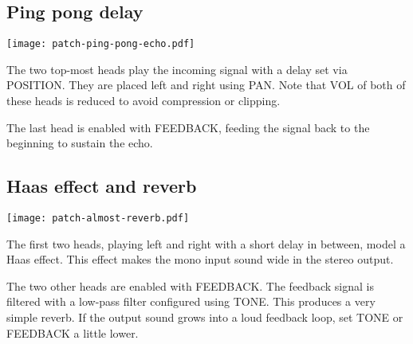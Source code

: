 \documentclass[11pt]{article}
\begin{document}
\newpage
\noindent\begin{minipage}[t]{0.45\textwidth}\vspace{1cm}\setlength{\parskip}{6pt}

\subsection{Ping pong delay}

\vspace{5mm}\begin{center}\texttt{[image: patch-ping-pong-echo.pdf]}\vspace{5mm}\end{center}

The two top-most heads play the incoming signal with a delay set via POSITION.
They are placed left and right using PAN.
Note that VOL of both of these heads is reduced to avoid compression or
clipping.

The last head is enabled with FEEDBACK, feeding the signal back to the beginning
to sustain the echo.

\end{minipage}\begin{minipage}{0.05\textwidth}\phantom{ }\end{minipage}\begin{minipage}[t]{0.45\textwidth}\vspace{1cm}\setlength{\parskip}{6pt}

\subsection{Haas effect and reverb}

\vspace{5mm}\begin{center}\texttt{[image: patch-almost-reverb.pdf]}\vspace{5mm}\end{center}

The first two heads, playing left and right with a short delay in between, model
a Haas effect. This effect makes the mono input sound wide in the stereo output.

The two other heads are enabled with FEEDBACK. The feedback signal is filtered
with a low-pass filter configured using TONE. This produces a very simple
reverb. If the output sound grows into a loud feedback loop, set TONE or
FEEDBACK a little lower.

\end{minipage}
\end{document}
